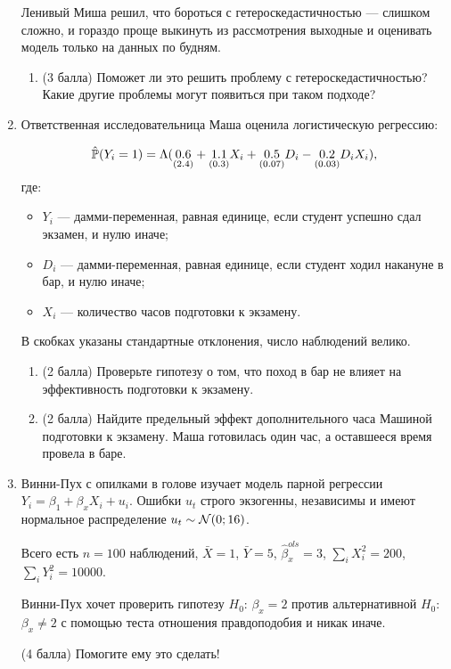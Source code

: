 \begin{enumerate}
\begin{enumerate}
\end{enumerate}

Ленивый Миша решил, что бороться с гетероскедастичностью — слишком сложно, и гораздо проще выкинуть из рассмотрения выходные и оценивать модель только на данных по будням. 

\begin{enumerate}[resume]
\item (3 балла) Поможет ли это решить проблему с гетероскедастичностью? Какие другие проблемы могут появиться при таком подходе?



\end{enumerate}



\item 
Ответственная исследовательница Маша оценила логистическую регрессию:

\[
\hat \P(Y_i = 1) = \Lambda( \underset{(2.4)}{0.6} + \underset{(0.3)}{1.1} X_i + \underset{(0.07)}{0.5} D_i - \underset{(0.03)}{0.2} D_i X_i),
\]
где:
\begin{itemize}
\item $Y_i$ — дамми-переменная, равная единице, если студент успешно сдал экзамен, и нулю иначе; 
\item $D_i$ — дамми-переменная, равная единице, если студент ходил накануне в бар, и нулю иначе;
\item $X_i$ — количество часов подготовки к экзамену. 
\end{itemize}

В скобках указаны стандартные отклонения, число наблюдений велико.

\begin{enumerate} 

\item (2 балла) Проверьте гипотезу о том, что поход в бар не влияет на эффективность подготовки к экзамену.

\item (2 балла) Найдите предельный эффект дополнительного часа Машиной подготовки к экзамену. 
Маша готовилась один час, а оставшееся время провела в баре.

\end{enumerate}


\item 
Винни-Пух с опилками в голове изучает модель парной регрессии $Y_i = \beta_1 + \beta_x X_i + u_i$.
Ошибки $u_t$ строго экзогенны, независимы и имеют нормальное распределение $u_t \sim \cN(0;16)$.

Всего есть $n=100$ наблюдений, $\bar X = 1$, $\bar Y= 5$, $\hat \beta_x^{ols} = 3$, $\sum_i X_i^2=200$, $\sum_i Y_i^2=10000$.


Винни-Пух хочет проверить гипотезу $H_0$: $\beta_x = 2$ против альтернативной $H_0$: $\beta_x \neq 2$ с помощью теста отношения правдоподобия и никак иначе. 


(4 балла) Помогите ему это сделать!


\end{enumerate}



